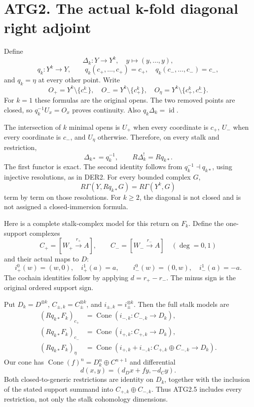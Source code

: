\section{ATG2. The actual k-fold diagonal right
adjoint}\label{atg2.-the-actual-k-fold-diagonal-right-adjoint}

Define \[
\Delta_k:Y\to Y^k,\quad y\mapsto(y,\ldots,y),
\] \[
q_k:Y^k\to Y,\qquad
q_k(c_+,\ldots,c_+)=c_+,\quad
q_k(c_-,\ldots,c_-)=c_-,
\] and \(q_k=\eta\) at every other point. Write \[
O_+=Y^k\setminus\{c_-^k\},\quad
O_-=Y^k\setminus\{c_+^k\},\quad
O_\eta=Y^k\setminus\{c_+^k,c_-^k\}.
\tag{ATG2.1}
\] For \(k=1\) these formulas are the original opens. The two removed
points are closed, so \(q_k^{-1}U_x=O_x\) proves continuity. Also
\(q_k\Delta_k=\operatorname{id}\).

The intersection of \(k\) minimal opens is \(U_+\) when every coordinate
is \(c_+\), \(U_-\) when every coordinate is \(c_-\), and \(U_\eta\)
otherwise. Therefore, on every stalk and restriction, \[
\boxed{\Delta_{k*}=q_k^{-1},\qquad R\Delta_k^!=Rq_{k*}.}
\tag{ATG2.2}
\] The first functor is exact. The second identity follows from
\(q_k^{-1}\dashv q_{k*}\), using injective resolutions, as in DER2. For
every bounded complex \(G\), \[
R\Gamma(Y,Rq_{k*}G)=R\Gamma(Y^k,G)
\tag{ATG2.3}
\] term by term on those resolutions. For \(k\ge2\), the diagonal is not
closed and is not assigned a closed-immersion formula.

Here is a complete stalk-complex model for this return on \(F_k\).
Define the one-support complexes \[
C_+=[W_+\xrightarrow{r_+}A],\qquad
C_-=[W_-\xrightarrow{r_-}A]
\quad(\deg=0,1)
\] and their actual maps to \(D\): \[
i_+^0(w)=(w,0),\quad i_+^1(a)=a,\qquad
i_-^0(w)=(0,w),\quad i_-^1(a)=-a.
\tag{ATG2.4}
\] The cochain identities follow by applying \(d=r_+-r_-\). The minus
sign is the original ordered support sign.

Put \(D_k=D^{\otimes k}\), \(C_{\pm,k}=C_\pm^{\otimes k}\), and
\(i_{\pm,k}=i_\pm^{\otimes k}\). Then the full stalk models are \[
\begin{aligned}
(Rq_{k*}F_k)_{c_+}&=\operatorname{Cone}(i_{-,k}:C_{-,k}\to D_k),\\
(Rq_{k*}F_k)_{c_-}&=\operatorname{Cone}(i_{+,k}:C_{+,k}\to D_k),\\
(Rq_{k*}F_k)_\eta&=\operatorname{Cone}(i_{+,k}+i_{-,k}:
 C_{+,k}\oplus C_{-,k}\to D_k).
\end{aligned}
\tag{ATG2.5}
\] Our cone has \(\operatorname{Cone}(f)^n=D_k^n\oplus C^{n+1}\) and
differential \[
d(x,y)=(d_Dx+fy,-d_Cy).
\tag{ATG2.6}
\] Both closed-to-generic restrictions are identity on \(D_k\), together
with the inclusion of the stated support summand into
\(C_{+,k}\oplus C_{-,k}\). Thus ATG2.5 includes every restriction, not
only the stalk cohomology dimensions.

